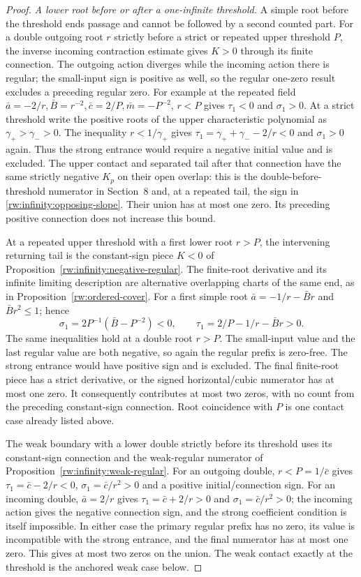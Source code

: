 \begin{proof}
\emph{A lower root before or after a one-infinite threshold.}
A simple root before the threshold ends passage and
cannot be followed by a second counted part.
For a double outgoing root $r$ strictly before a strict
or repeated upper threshold $P$, the inverse incoming
contraction estimate gives $K>0$ through its finite
connection. The outgoing action diverges while the
incoming action there is regular; the small-input sign
is positive as well, so the regular one-zero result
excludes a preceding regular zero.
For example at the repeated field
$\bar a=-2/r,\bar B=r^{-2},\bar c=2/P,
\bar m=-P^{-2}$, $r<P$ gives
$\tau_1<0$ and $\sigma_1>0$. At a strict threshold
write the positive roots of the upper characteristic
polynomial as $\gamma_+>\gamma_->0$.
The inequality $r<1/\gamma_+$ gives
$\tau_1=\gamma_++\gamma_--2/r<0$ and
$\sigma_1>0$ again.
Thus the strong entrance would require a negative
initial value and is excluded.
The upper contact and separated tail after that connection
have the same strictly negative $K_p$ on their open
overlap: this is the double-before-threshold numerator
in Section~8 and, at a repeated tail, the sign in
\eqref{rw:infinity:opposing-slope}.
Their union has at most one zero. Its preceding positive
connection does not increase this bound.

At a repeated upper threshold with a first lower root
$r>P$, the intervening returning tail is the
constant-sign piece $K<0$ of
Proposition~\ref{rw:infinity:negative-regular}.
The finite-root derivative and its infinite limiting
description are alternative overlapping charts of the
same end, as in Proposition~\ref{rw:ordered-cover}.
For a first simple root
$\bar a=-1/r-\bar Br$ and $\bar Br^2\le1$; hence
\[
 \sigma_1=2P^{-1}(\bar B-P^{-2})<0,\qquad
 \tau_1=2/P-1/r-\bar Br>0.
\]
The same inequalities hold at a double root $r>P$.
The small-input value and the last regular value are
both negative, so again the regular prefix is zero-free.
The strong entrance would have positive sign and is
excluded. The final finite-root piece has a strict
derivative, or the signed horizontal/cubic numerator
has at most one zero. It consequently contributes at
most two zeros, with no count from the preceding
constant-sign connection. Root coincidence with $P$
is one contact case already listed above.

The weak boundary with a lower double strictly before
its threshold uses its constant-sign connection and the
weak-regular numerator of
Proposition~\ref{rw:infinity:weak-regular}.
For an outgoing double, $r<P=1/\bar c$ gives
$\tau_1=\bar c-2/r<0$, $\sigma_1=\bar c/r^2>0$
and a positive initial/connection sign.
For an incoming double, $\bar a=2/r$ gives
$\tau_1=\bar c+2/r>0$ and $\sigma_1=\bar c/r^2>0$;
the incoming action gives the negative connection sign,
and the strong coefficient condition is itself impossible.
In either case the primary
regular prefix has no zero, its value is incompatible
with the strong entrance, and the final numerator has
at most one zero. This gives at most two zeros on the
union. The weak contact exactly at the threshold is
the anchored weak case below.


\end{proof}
